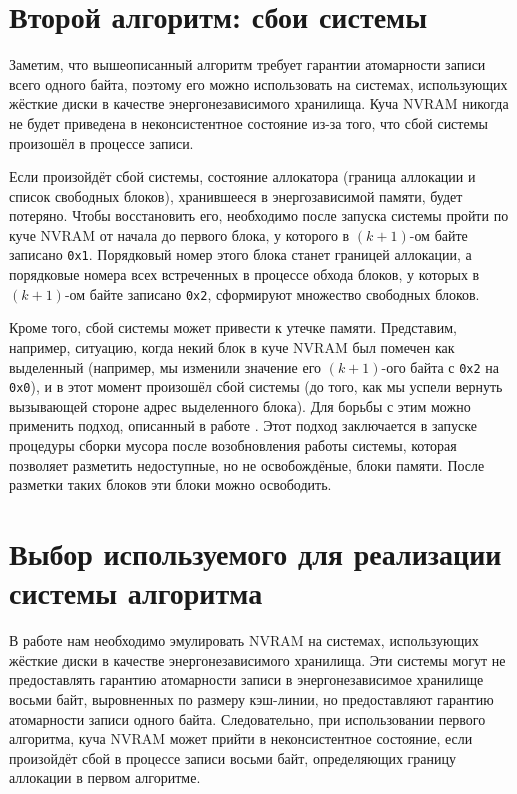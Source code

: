 \documentclass[times,specification,annotation]{itmo-student-thesis}
\begin{document}
\section{Второй алгоритм: сбои системы}

Заметим, что вышеописанный алгоритм требует гарантии атомарности записи всего одного байта, поэтому его можно использовать на системах, использующих жёсткие диски в качестве энергонезависимого хранилища. Куча NVRAM никогда не будет приведена в неконсистентное состояние из-за того, что сбой системы произошёл в процессе записи.

Если произойдёт сбой системы, состояние аллокатора (граница аллокации и список свободных блоков), хранившееся в энергозависимой памяти, будет потеряно. Чтобы восстановить его, необходимо после запуска системы пройти по куче NVRAM от начала до первого блока, у которого в $(k + 1)$-ом байте записано \texttt{0x1}. Порядковый номер этого блока станет границей аллокации, а порядковые номера всех встреченных в процессе обхода блоков, у которых в $(k + 1)$-ом байте записано \texttt{0x2}, сформируют множество свободных блоков.

Кроме того, сбой системы может привести к утечке памяти. Представим, например, ситуацию, когда некий блок в куче NVRAM был помечен как выделенный (например, мы изменили значение его $(k + 1)$-ого байта с \texttt{0x2} на \texttt{0x0}), и в этот момент произошёл сбой системы (до того, как мы успели вернуть вызывающей стороне адрес выделенного блока). Для борьбы с этим можно применить подход, описанный в работе \cite{cai2020understanding}. Этот подход заключается в запуске процедуры сборки мусора после возобновления работы системы, которая позволяет разметить недоступные, но не освобождёные, блоки памяти. После разметки таких блоков эти блоки можно освободить.

\section{Выбор используемого для реализации системы алгоритма}

В работе нам необходимо эмулировать NVRAM на системах, использующих жёсткие диски в качестве энергонезависимого хранилища. Эти системы могут не предоставлять гарантию атомарности записи в энергонезависимое хранилище восьми байт, выровненных по размеру кэш-линии, но предоставляют гарантию атомарности записи одного байта. Следовательно, при использовании первого алгоритма, куча NVRAM может прийти в неконсистентное состояние, если произойдёт сбой в процессе записи восьми байт, определяющих границу аллокации в первом алгоритме.
\end{document}
